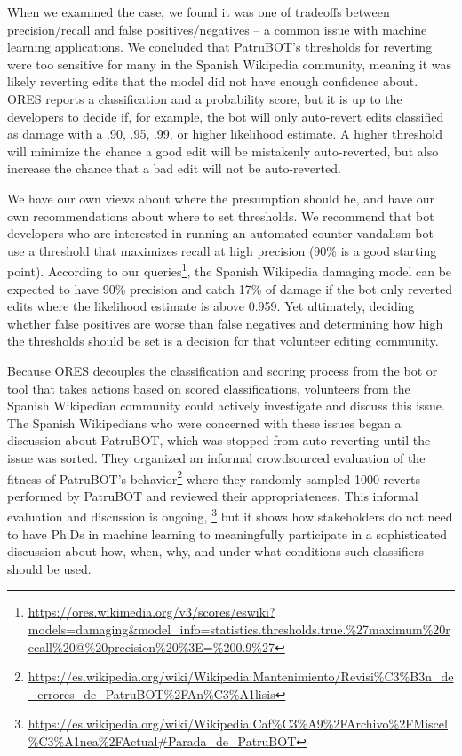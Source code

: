 When we examined the case, we found it was one of tradeoffs between precision/recall and false positives/negatives -- a common issue with machine learning applications. We concluded that PatruBOT's thresholds for reverting were too sensitive for many in the Spanish Wikipedia community, meaning it was likely reverting edits that the model did not have enough confidence about. ORES reports a classification and a probability score, but it is up to the developers to decide if, for example, the bot will only auto-revert edits classified as damage with a .90, .95, .99, or higher likelihood estimate. A higher threshold will minimize the chance a good edit will be mistakenly auto-reverted, but also increase the chance that a bad edit will not be auto-reverted. 

We have our own views about where the presumption should be, and have our own recommendations about where to set thresholds. We recommend that bot developers who are interested in running an automated counter-vandalism bot use a threshold that maximizes recall at high precision (90\% is a good starting point). According to our queries\footnote{\url{https://ores.wikimedia.org/v3/scores/eswiki?models=damaging&model_info=statistics.thresholds.true.\%27maximum\%20recall\%20@\%20precision\%20\%3E=\%200.9\%27}}, the Spanish Wikipedia damaging model can be expected to have 90\% precision and catch 17\% of damage if the bot only reverted edits where the likelihood estimate is above 0.959. Yet ultimately, deciding whether false positives are worse than false negatives and determining how high the thresholds should be set is a decision for that volunteer editing community. 

Because ORES decouples the classification and scoring process from the bot or tool that takes actions based on scored classifications, volunteers from the Spanish Wikipedian community could actively investigate and discuss this issue. The Spanish Wikipedians who were concerned with these issues began a discussion about PatruBOT, which was stopped from auto-reverting until the issue was sorted. They organized an informal crowdsourced evaluation of the fitness of PatruBOT's behavior\footnote{\url{https://es.wikipedia.org/wiki/Wikipedia:Mantenimiento/Revisi\%C3\%B3n_de_errores_de_PatruBOT\%2FAn\%C3\%A1lisis}} where they randomly sampled 1000 reverts performed by PatruBOT and reviewed their appropriateness. This informal evaluation and discussion is ongoing, \footnote{\url{https://es.wikipedia.org/wiki/Wikipedia:Caf\%C3\%A9\%2FArchivo\%2FMiscel\%C3\%A1nea\%2FActual\#Parada_de_PatruBOT}} but it shows how stakeholders do not need to have Ph.Ds in machine learning to meaningfully participate in a sophisticated discussion about how, when, why, and under what conditions such classifiers should be used.

